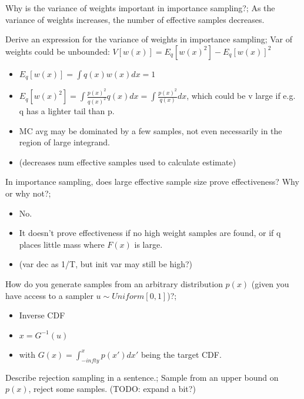 \documentclass{article}
\begin{document}
Why is the variance of weights important in importance sampling?; As the variance of weights increases, the number of effective samples decreases.

Derive an expression for the variance of weights in importance sampling; Var of weights could be unbounded: $V[w(x)] = E_q[w(x)^2] - E_q[w(x)]^2$ \begin{itemize} \item $E_q[w(x)] = \int q(x)w(x)dx = 1$ \item $E_q[w(x)^2] = \int \frac{p(x)^2}{q(x)^2}q(x)dx = \int \frac{p(x)^2}{q(x)}dx$, which could be v large if e.g. q has a lighter tail than p.  \item MC avg may be dominated by a few samples, not even necessarily in the region of large integrand. \item (decreases num effective samples used to calculate estimate) \end{itemize}

In importance sampling, does large effective sample size prove effectiveness? Why or why not?; \begin{itemize} \item No. \item It doesn't prove effectiveness if no high weight samples are found, or if q places little mass where $F(x)$ is large. \item (var dec as 1/T, but init var may still be high?) \end{itemize}

How do you generate samples from an arbitrary distribution $p(x)$ (given you have access to a sampler $u\sim Uniform[0,1]$)?; \begin{itemize} \item Inverse CDF \item $x = G^{-1}(u)$ \item with $G(x) = \int_{-infty}^x p(x')dx'$ being the target CDF. \end{itemize}

Describe rejection sampling in a sentence.; Sample from an upper bound on $p(x)$, reject some samples. (TODO: expand a bit?)
\end{document}
